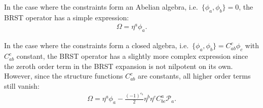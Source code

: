     \begin{example}
        In the case where the constraints form an Abelian algebra, i.e.~$\{\phi_a,\phi_b\}=0$, the BRST operator has a simple expression:
        \begin{gather}
            \Omega = \eta^a\phi_a.
        \end{gather}
    \end{example}
    \begin{example}
        In the case where the constraints form a closed algebra, i.e.~$\{\phi_a,\phi_b\}=C^c_{ab}\phi_c$ with $C^c_{ab}$ constant, the BRST operator has a slightly more complex expression since the zeroth order term in the BRST expansion is not nilpotent on its own. However, since the structure functions $C^c_{ab}$ are constants, all higher order terms still vanish:
        \begin{gather}
            \Omega = \eta^a\phi_a -\frac{(-1)^{\varepsilon_b}}{2}\eta^b\eta^c C^a_{bc}\mathcal{P}_a.
        \end{gather}
    \end{example}
